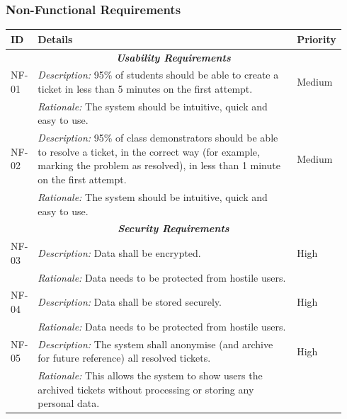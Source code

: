 \documentclass[a4paper,11pt]{article}
\begin{document}
\subsubsection{Non-Functional Requirements}

\begin{table}[H]
\small
\begin{tabular}{|p{0.07\linewidth} | p{0.78\linewidth} |p{0.09\linewidth}|}
 \hline
 \textbf{ID} & \textbf{Details} & \textbf{Priority} \\
 
 \hline
   \multicolumn{3}{c}{\textit{\textbf{Usability Requirements}}}\\
 \hline
 
   NF-01 & \textit{Description:} 95\% of students should be able to create a ticket in less than 5 minutes on the first attempt. & Medium \\
  \cline{2-2}
  & \textit{Rationale:} The system should be intuitive, quick and easy to use. & \\

   \hline\hline
      NF-02 & \textit{Description:} 95\% of class demonstrators should be able to resolve a ticket, in the correct way (for example, marking the problem as resolved), in less than 1 minute on the first attempt. & Medium \\
  \cline{2-2}
  & \textit{Rationale:} The system should be intuitive, quick and easy to use. & \\
   \hline
     
     \multicolumn{3}{c}{\textit{\textbf{Security Requirements}}}\\
     
     \hline
 NF-03 & \textit{Description:} Data shall be encrypted. & High\\
  \cline{2-2}
  & \textit{Rationale:} Data needs to be protected from hostile users. & \\
  
    \hline\hline
 NF-04 & \textit{Description:} Data shall be stored securely. & High\\
  \cline{2-2}
  & \textit{Rationale:} Data needs to be protected from hostile users. & \\
  
      \hline\hline
 NF-05 & \textit{Description:} The system shall anonymise (and archive for future reference) all resolved tickets. & High\\
  \cline{2-2}
  & \textit{Rationale:} This allows the system to show users the archived tickets without processing or storing any personal data. & \\
  

\end{tabular}
\end{table}
\end{document}
